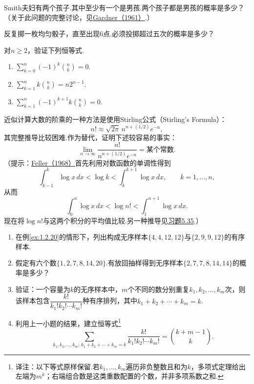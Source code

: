 \begin{exercise}\label{exercise:1.25}
Smith夫妇有两个孩子.其中至少有一个是男孩.两个孩子都是男孩的概率是多少？（关于此问题的完整讨论，见\hyperref[bib:source132]{Gardner（1961）}.）
\end{exercise}

\begin{exercise}\label{exercise:1.26}
反复掷一枚均匀骰子，直至出现6点.必须投掷超过五次的概率是多少？
\end{exercise}

\begin{exercise}\label{exercise:1.27}
对$n\ge2$，验证下列恒等式.
\begin{enumerate}
\item[(a)] $\sum_{k=0}^n(-1)^k\binom nk=0$.
\item[(b)] $\sum_{k=1}^n k\binom nk=n2^{n-1}$.
\item[(c)] $\sum_{k=1}^n(-1)^{k+1}k\binom nk=0$.
\end{enumerate}
\end{exercise}

\begin{exercise}\label{exercise:1.28}
近似计算大数的阶乘的一种方法是使用Stirling公式（Stirling's Formula）：
$$
n!\approx\sqrt{2\pi}\,n^{n+(1/2)}e^{-n},
$$
其完整推导比较困难.作为替代，证明下述较容易的事实：
$$
\lim_{n\to\infty}\frac{n!}{n^{n+(1/2)}e^{-n}}=\text{某个常数}.
$$
（提示：\hyperref[bib:source118]{Feller（1968）}首先利用对数函数的单调性得到
$$
\int_{k-1}^{k}\log x\,dx<\log k<\int_k^{k+1}\log x\,dx,
\qquad k=1,\ldots,n,
$$
从而
$$
\int_0^n\log x\,dx<\log n!<\int_1^{n+1}\log x\,dx.
$$
现在将$\log n!$与这两个积分的平均值比较.另一种推导见\hyperref[exercise:5.35]{习题5.35}.）
\end{exercise}



\begin{exercise}\label{exercise:1.29}\leavevmode
\begin{enumerate}
\item[(a)] 在例\ref{ex:1.2.20}的情形下，列出构成无序样本$\{4,4,12,12\}$与$\{2,9,9,12\}$的有序样本.
\item[(b)] 假定有六个数$\{1,2,7,8,14,20\}$.有放回抽样得到无序样本$\{2,7,7,8,14,14\}$的概率是多少？
\item[(c)] 验证：一个容量为$k$的无序样本中，$m$个不同的数分别重复$k_1,k_2,\ldots,k_m$次，则该样本包含$\dfrac{k!}{k_1!k_2!\cdots k_m!}$种有序排列，其中$k_1+k_2+\cdots+k_m=k$.
\item[(d)] 利用上一小题的结果，建立恒等式\footnote{译注：以下等式原样保留.若$k_1,\ldots,k_m$遍历非负整数且和为$k$，多项式定理给出左端为$m^k$；右端组合数是这类重数配置的个数，并非多项系数之和.}
$$
\sum_{k_1,k_2,\ldots,k_m:\,k_1+k_2+\cdots+k_m=k}
\frac{k!}{k_1!k_2!\cdots k_m!}=\binom{k+m-1}{k}.
$$
\end{enumerate}
\end{exercise}

